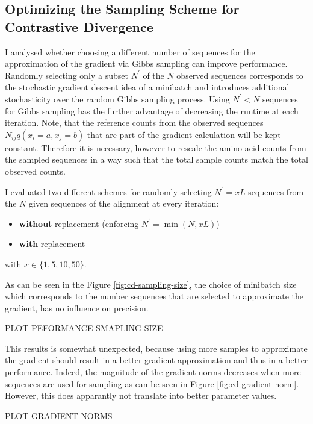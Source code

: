 \documentclass[12pt,a4paper,twoside]{book}
\providecommand{\tightlist}{%
  \setlength{\itemsep}{0pt}\setlength{\parskip}{0pt}}
\newcommand{\eq}{\!=\!}
\theoremstyle{definition}
\theoremstyle{definition}
\theoremstyle{remark}
\begin{document}
\subsection{Optimizing the Sampling Scheme for Contrastive
Divergence}\label{optimizing-the-sampling-scheme-for-contrastive-divergence}

I analysed whether choosing a different number of sequences for the
approximation of the gradient via Gibbs sampling can improve
performance. Randomly selecting only a subset \(N^{\prime}\) of the
\(N\) observed sequences corresponds to the stochastic gradient descent
idea of a minibatch and introduces additional stochasticity over the
random Gibbs sampling process. Using \(N^{\prime} < N\) sequences for
Gibbs sampling has the further advantage of decreasing the runtime at
each iteration. Note, that the reference counts from the observed
sequences \(N_{ij} q(x_i \eq a, x_j \eq b)\) that are part of the
gradient calculation will be kept constant. Therefore it is necessary,
however to rescale the amino acid counts from the sampled sequences in a
way such that the total sample counts match the total observed counts.

I evaluated two different schemes for randomly selecting
\(N^{\prime} \eq xL\) sequences from the \(N\) given sequences of the
alignment at every iteration:

\begin{itemize}
\tightlist
\item
  \textbf{without} replacement (enforcing
  \(N^{\prime} \eq \min(N, xL)\))
\item
  \textbf{with} replacement
\end{itemize}

with \(x \in \{ 1, 5, 10, 50 \}\).

As can be seen in the Figure \ref{fig:cd-sampling-size}, the choice of
minibatch size which corresponds to the number sequences that are
selected to approximate the gradient, has no influence on precision.

PLOT PEFORMANCE SMAPLING SIZE

This results is somewhat unexpected, because using more samples to
approximate the gradient should result in a better gradient
approximation and thus in a better performance. Indeed, the magnitude of
the gradient norms decreases when more sequences are used for sampling
as can be seen in Figure \ref{fig:cd-gradient-norm}. However, this does
apparantly not translate into better parameter values.

PLOT GRADIENT NORMS
\end{document}
